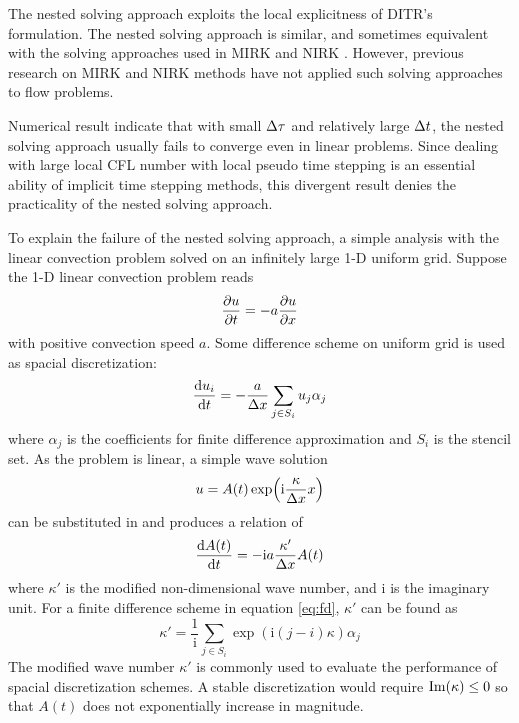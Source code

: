 \documentclass[preprint,12pt]{elsarticle}
\begin{document}
The nested solving approach exploits the
local explicitness of DITR's formulation.
The nested solving approach is similar, and sometimes equivalent with
the solving approaches used in MIRK \cite{cash1975classMIRKOrig,cash1977clasMIRK1,cash1982monoMIRK2}
and NIRK \cite{kulikov2006familyNIRKOrig,kulikov2009adaptive,kulikov2007asymptotic}.
However, previous research on MIRK and NIRK methods have not
applied such solving approaches to flow problems.

Numerical result indicate that with small $\mathrm\Delta\tau$
and relatively large $\mathrm\Delta t$,
the nested solving approach usually fails to converge even in
linear problems.
Since dealing with large local CFL number with local
pseudo time stepping is an essential ability of implicit
time stepping methods,
this divergent result denies the practicality of the
nested solving approach.

\newcommand{\imagUnit}{\mathrm{i}}

To explain the failure of the nested solving approach,
a simple analysis with the linear convection problem
solved on an infinitely large 1-D uniform
grid.
Suppose the 1-D linear convection problem reads
\begin{equation}
    \partialderivative{u}{t} = -a \partialderivative{u}{x}
\end{equation}
with positive convection speed $a$.
Some difference scheme on uniform grid is used as spacial discretization:
\begin{equation}
    \derivative{u_i}{t} = -\frac{a}{\inc x} \sum_{j\in S_i}u_j\alpha_j
    \label{eq:fd}
\end{equation}
where $\alpha_j$ is the coefficients for finite difference approximation
and $S_i$ is the stencil set.
As the problem is linear,
a simple wave solution
\begin{equation}
    u = A(t)\exp(\imagUnit \frac{\kappa}{\inc x} x)
\end{equation}
can be substituted in and produces
a relation of
\begin{equation}
    \frac{\dd A(t)}{\dd t} = -\imagUnit a\frac{\kappa'}{\inc x}  A(t)
\end{equation}
where $\kappa'$ is the modified non-dimensional wave number,
and $\imagUnit$ is the imaginary unit.
For a finite difference scheme in equation \eqref{eq:fd},
$\kappa'$ can be found as
\begin{equation}
    \kappa' = \frac{1}{\imagUnit} \sum_{j\in S_i}\exp(\imagUnit (j-i)\kappa)\alpha_j
\end{equation}
The modified wave number $\kappa'$ is commonly used to evaluate the performance of
spacial discretization schemes.
A stable discretization would require $\mathrm{Im}(\kappa) \leq 0$ so that
$A(t)$ does not exponentially increase in magnitude.
\end{document}
